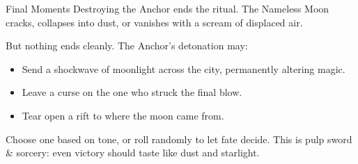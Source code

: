 \begin{CommentBox}{Final Moments}
    Destroying the Anchor ends the ritual. The Nameless Moon cracks, collapses into dust, or vanishes with a scream of displaced air.

    But nothing ends cleanly. The Anchor’s detonation may:
    \begin{itemize}
        \item Send a shockwave of moonlight across the city, permanently altering magic.
        \item Leave a curse on the one who struck the final blow.
        \item Tear open a rift to where the moon came from.
    \end{itemize}

    Choose one based on tone, or roll randomly to let fate decide. This is pulp sword \& sorcery: even victory should taste like dust and starlight.
\end{CommentBox}

